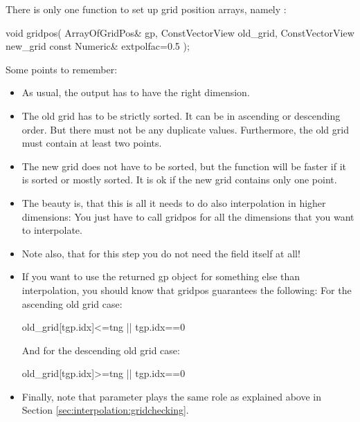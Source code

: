 There is only one function to set up grid position arrays, namely 
:

\begin{code}
void gridpos( ArrayOfGridPos& gp,
              ConstVectorView old_grid,
              ConstVectorView new_grid 
              const Numeric&  extpolfac=0.5 );
\end{code}

\hspace{-\parindent}Some points to remember:
\begin{itemize}
\item As usual, the output  has to have the right dimension. 
  
\item The old grid has to be strictly sorted. It can be in ascending
  or descending order. But there must not be any duplicate values.
  Furthermore, the old grid must contain at least two points.
  
\item   The new grid does not have to be sorted, but the function will be
  faster if it is sorted or mostly sorted. It is ok if the new grid
  contains only one point.
  
\item   The beauty is, that this is all it needs to do also interpolation in
  higher dimensions: You just have to call gridpos for all the
  dimensions that you want to interpolate.
  
\item   Note also, that for this step you do not need the field itself at
  all!

\item   If you want to use the returned gp object for something else
  than interpolation, you should know that gridpos guarantees the
  following:\newline
  For the ascending old grid case: 
   \begin{code}
   old_grid[tgp.idx]<=tng || tgp.idx==0
   \end{code}

  And for the descending old grid case: 
   \begin{code}
   old_grid[tgp.idx]>=tng || tgp.idx==0
   \end{code}

\item   Finally, note that parameter  plays the
  same role as explained above in Section
  \ref{sec:interpolation:gridchecking}. 
\end{itemize}

